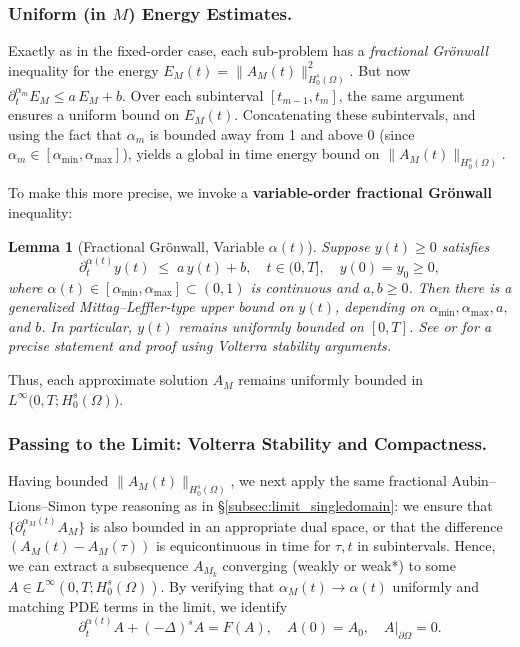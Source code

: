 \documentclass[12pt]{article}
\newtheorem{lemma}[theorem]{Lemma}
\begin{document}
\subsubsection{Uniform (in \(M\)) Energy Estimates.}
Exactly as in the fixed-order case, each sub-problem has a \emph{fractional Grönwall}
inequality for the energy
\(\displaystyle
E_M(t) = \|A_M(t)\|_{H_0^s(\Omega)}^2
\).
But now \(\partial_t^{\alpha_m} E_M\le a\,E_M +b\). Over each subinterval
\([t_{m-1}, t_m]\), the same argument ensures a uniform bound on \(E_M(t)\). Concatenating
these subintervals, and using the fact that \(\alpha_m\) is bounded away from 1 and above
0 (since \(\alpha_m\in[\alpha_{\min},\alpha_{\max}]\)), yields a global in time energy
bound on \(\|A_M(t)\|_{H_0^s(\Omega)}\).  

To make this more precise, we invoke a \textbf{variable-order fractional Grönwall}
inequality:

\begin{lemma}[Fractional Grönwall, Variable \(\alpha(t)\)]
\label{lem:FG_VarAlpha_expanded}
Suppose \(y(t)\ge0\) satisfies
\[
\partial_t^{\alpha(t)} y(t)
\;\le\;
a\,y(t) + b,
\quad
t\in(0,T],
\quad
y(0)=y_0\ge0,
\]
where \(\alpha(t)\in [\alpha_{\min},\alpha_{\max}]\subset(0,1)\) is continuous and
\(a,b\ge0\). Then there is a generalized Mittag–Leffler‐type upper bound on \(y(t)\),
depending on \(\alpha_{\min}, \alpha_{\max}, a,\) and \(b\).  In particular, \(y(t)\)
remains uniformly bounded on \([0,T]\). See \cite[Section~3]{Ye2007} or \cite{Sun2019}
for a precise statement and proof using \emph{Volterra stability} arguments.
\end{lemma}

Thus, each approximate solution \(A_M\) remains uniformly bounded in
\(\displaystyle L^\infty\bigl(0,T;H_0^s(\Omega)\bigr)\).

\subsubsection{Passing to the Limit: Volterra Stability and Compactness.}
Having bounded \(\|A_M(t)\|_{H_0^s(\Omega)}\), we next apply the same fractional
Aubin–Lions–Simon type reasoning as in \S\ref{subsec:limit_singledomain}: we ensure that
\(\{\partial_t^{\alpha_M(t)}A_M\}\) is also bounded in an appropriate dual space, or that
the difference \((A_M(t)-A_M(\tau))\) is equicontinuous in time for \(\tau,t\) in subintervals.
Hence, we can extract a subsequence \(A_{M_k}\) converging (weakly or weak*) to some
\(A\in L^\infty(0,T;H_0^s(\Omega))\). By verifying that \(\alpha_M(t)\to\alpha(t)\) 
uniformly and matching PDE terms in the limit, we identify
\[
\partial_t^{\alpha(t)} A + (-\Delta)^s A = F(A),
\quad
A(0)=A_0,
\quad
A|_{\partial\Omega}=0.
\]
\end{document}
